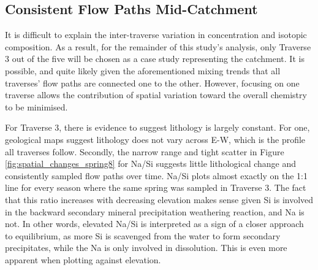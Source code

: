 \newpage

\subsection{Consistent Flow Paths Mid-Catchment}

It is difficult to explain the inter-traverse variation in concentration and isotopic composition. As a result, for the remainder of this study's analysis, only Traverse 3 out of the five will be chosen as a case study representing the catchment. It is possible, and quite likely given the aforementioned mixing trends that all traverses' flow paths are connected one to the other. However, focusing on one traverse allows the contribution of spatial variation toward the overall chemistry to be minimised. 

\bsk

For Traverse 3, there is evidence to suggest lithology is largely constant. For one, geological maps suggest lithology does not vary across E-W, which is the profile all traverses follow. Secondly, the narrow range and tight scatter in Figure \ref{fig:spatial_changes_spring8} for Na/Si suggests little lithological change and consistently sampled flow paths over time. Na/Si plots almost exactly on the 1:1 line for every season where the same spring was sampled in Traverse 3. The fact that this ratio increases with decreasing elevation makes sense given Si is involved in the backward secondary mineral precipitation weathering reaction, and Na is not. In other words, elevated Na/Si is interpreted as a sign of a closer approach to equilibrium, as more Si is scavenged from the water to form secondary precipitates, while the Na is only involved in dissolution. This is even more apparent when plotting against elevation. 

